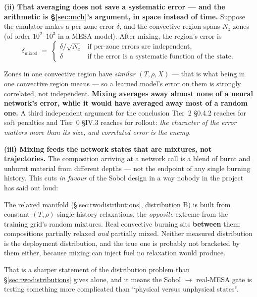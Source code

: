\textbf{(ii) That averaging does not save a systematic error --- and the
arithmetic is \S\ref{sec:mch}'s argument, in space instead of time.} Suppose the
emulator makes a per-zone \Ye{} error $\delta$, and the convective region spans
$N_z$ zones (of order $10^2$--$10^3$  in a MESA model). After mixing, the region's error is
%
\begin{equation}
\delta_{\text{mixed}} \;=\;
\begin{cases}
\delta/\sqrt{N_z} & \text{if per-zone errors are independent},\\[2pt]
\delta & \text{if the error is a systematic function of the state.}
\end{cases}
\label{eq:mixederror}
\end{equation}

Zones in one convective region have \emph{similar} $(T, \rho, X)$ --- that is
what being in one convective region means --- so a learned model's error on
them is strongly correlated, not independent. \textbf{Mixing averages away
almost none of a neural network's error, while it would have averaged away most
of a random one.} A third independent argument for the conclusion Tier~2
\S0.4.2 reaches for soft penalties and Tier~0 \S IV.3 reaches for rollout:
\emph{the character of the error matters more than its size, and correlated
error is the enemy.} \derivedhere

\textbf{(iii) Mixing feeds the network states that are mixtures, not
trajectories.} The composition arriving at a network call is a blend of burnt
and unburnt material from different depths --- not the endpoint of any single
burning history. This cuts \emph{in favour} of the Sobol design in a way nobody
in the project has said out loud:

\begin{warn}
The relaxed manifold (\S\ref{sec:twodistributions}, distribution B) is built
from constant-$(T, \rho)$ single-history relaxations, the \emph{opposite}
extreme from the training grid's random mixtures. Real convective burning sits
\textbf{between} them: compositions partially relaxed \emph{and} partially
mixed. Neither measured distribution is the deployment distribution, and the
true one is probably not bracketed by them either, because mixing can inject
fuel no relaxation would produce.
\end{warn}

That is a sharper statement of the distribution problem than
\S\ref{sec:twodistributions} gives alone, and it means the Sobol $\to$
real-MESA gate is testing something more complicated than ``physical versus
unphysical states''.


